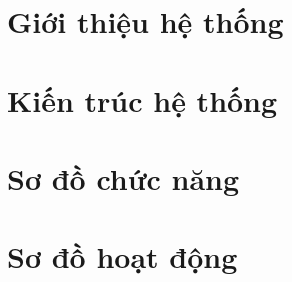 \documentclass[../main-report.tex]{subfiles}
\begin{document}
\section{Giới thiệu hệ thống}

\section{Kiến trúc hệ thống}

\section{Sơ đồ chức năng}

\section{Sơ đồ hoạt động}
\end{document}
